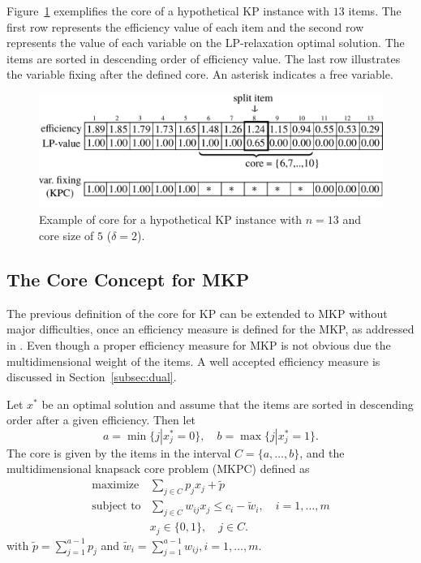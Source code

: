 Figure~\ref{fig:kpcore} exemplifies the core of a hypothetical KP instance with
$13$ items.
The first row represents the efficiency value of each item and the second row
represents the value of each variable on the LP-relaxation optimal solution.
The items are sorted in descending order of efficiency value.
The last row illustrates the variable fixing after the defined core.
An asterisk indicates a free variable.

\begin{figure}[h]
  \centering
  \includegraphics[scale=0.37]{imgs/kp}
  \caption{Example of core for a hypothetical KP instance with $n=13$ and core size of $5$ ($\delta = 2$).}
  \label{fig:kpcore}
\end{figure}

\subsection{The Core Concept for MKP}

The previous definition of the core for KP can be extended to MKP without major
difficulties, once an efficiency measure is defined for the MKP,
as addressed in \cite{puchinger2006core}.
Even though a proper efficiency measure for MKP is not obvious due the
multidimensional weight of the items.
A well accepted efficiency measure is discussed in Section~\ref{subsec:dual}.

Let $x^*$ be an optimal solution and assume that the items are sorted in
descending order after a given efficiency. Then let
\begin{displaymath}
  a = \min \{ j | x_j^* = 0 \}, \quad b = \max \{ j | x_j^* = 1 \}.
\end{displaymath}
The core is given by the items in the interval $C = \{ a, \ldots, b \}$,
and the multidimensional knapsack core problem (MKPC) defined as
\begin{align*}
  \text{maximize} & \sum_{j \in C} p_j x_j  + \tilde{p}\\
  \text{subject to} & \sum_{j \in C} w_{ij} x_j \leqslant c_i - \tilde{w}_i, \quad i = 1, \ldots, m\\
  & x_j \in \{0, 1\}, \quad j \in C.
\end{align*}
with $\tilde{p} = \sum^{a-1}_{j=1} p_j$  and $\tilde{w}_i = \sum^{a-1}_{j=1} w_{ij}, i = 1, \ldots, m$.

